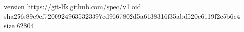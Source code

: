 version https://git-lfs.github.com/spec/v1
oid sha256:89c9ef72009249635323397cd9667802d5a6138316f35abd520c6119f2c5b6c4
size 62804
